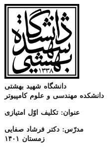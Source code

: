 \begin{titlepage}
\begin{center}
\includegraphics[width=0.3\textwidth]{./figures/sbu-logo.svg.png}\\
        
\LARGE
\textbf{دانشگاه شهید بهشتی}\\
\textbf{دانشکده مهندسی و علوم کامپیوتر}\\
        
\vfill
        
\huge
\textbf{عنوان: تکلیف اوّل امتیازی}\\
        
\vfill
        
\LARGE
\textbf{مدرّس: دکتر فرشاد صفایی}\\
\textbf{زمستان ۱۴۰۱}\\
\end{center}
\end{titlepage}
